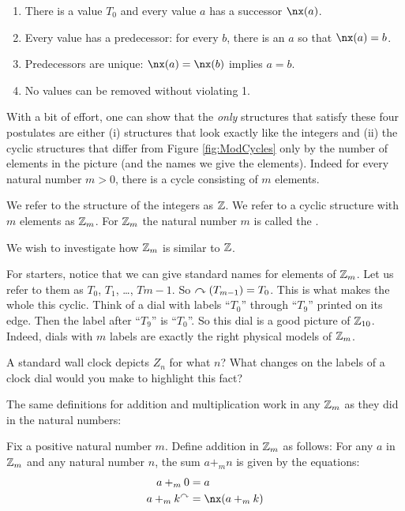 \begin{enumerate}
	\item There is a value $T_0$ and every value $a$ has a successor $\nx(a)$.
	\item Every value has a predecessor: for every $b$, there is an $a$ so that $\nx(a) = b$.
	\item Predecessors are unique: $\nx(a) = \nx(b)$ implies $a=b$.
	\item No values can be removed without violating 1.
\end{enumerate}

With a bit of effort, one can show that the \emph{only} structures that satisfy these four postulates are either (i) structures that look exactly like the integers and (ii) the cyclic structures that differ from Figure \ref{fig:ModCycles} only by the number of elements in the picture (and the names we give the elements). Indeed for every natural number $m>0$, there is a cycle consisting of $m$ elements.

\begin{defn}
	We refer to the structure of the integers as ${\mathbb Z}$. We refer to a cyclic structure with $m$ elements as ${\mathbb Z}_m$. For ${\mathbb Z}_m$ the natural number $m$ is called the .
\end{defn}

We wish to investigate how ${\mathbb Z}_m$ is similar to ${\mathbb Z}$. 

For starters, notice that we can give standard names for elements of ${\mathbb Z}_m$. Let us refer to them as $T_0$, $T_1$, \ldots, $T{m-1}$. So $\curvearrowright(T_{m-1}) = T_0$. This is what makes the whole this cyclic.
Think of a dial with labels ``$T_0$'' through ``$T_9$'' printed on its edge. Then the label after ``$T_9$'' is ``$T_0$''. So this dial is a good picture of ${\mathbb Z}_{10}$. Indeed, dials with $m$ labels are exactly the right physical models of ${\mathbb Z}_m$. 

\begin{exer}
	\begin{exercise}
		\item A standard wall clock depicts $Z_n$ for what $n$? What changes on the labels of a clock dial would you make to highlight this fact?
	\end{exercise}
\end{exer}   

The same definitions for addition and multiplication work in any ${\mathbb Z}_m$ as they did in the natural numbers:

\begin{defn}
	Fix a positive natural number $m$. Define addition in ${\mathbb Z}_m$ as follows: For any $a$ in ${\mathbb Z}_m$ and any natural number $n$, the sum $a+_m n$ is given by the equations:
	\begin{align*}
		a +_m 0 &= a\\
		a +_m k^\nxt &= \nx(a+_m k)
	\end{align*}
\end{defn}

